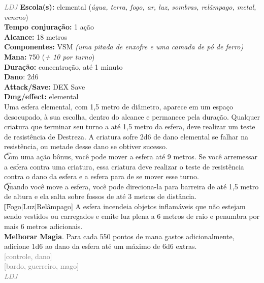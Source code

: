 \documentclass{RPG_Adventure}[2021/10/20]
\begin{document}
{\tiny \textcolor{gray}{\textit{LDJ}}}\jump{}
{\small \t \textbf{Escola(s):} elemental (\textit{água, terra, fogo, ar, luz, sombras, relâmpago, metal, veneno})\\\t \textbf{Tempo conjuração:} 1 ação\\\t \textbf{Alcance:} 18 metros\\\t \textbf{Componentes:} VSM \textit{(uma pitada de enxofre e uma camada de pó de ferro)}\\\t \textbf{Mana:} 750 (\textit{+ 10 por turno})\\\t \textbf{Duração:} concentração, até 1 minuto\\\t \textbf{Dano}: 2d6\\\t \textbf{Attack/Save:} DEX Save\\\t \textbf{Dmg/effect:} elemental\\}
{\normalsize Uma esfera elemental, com 1,5 metro de diâmetro, aparece em um espaço desocupado, à sua escolha, dentro do alcance e permanece pela duração. Qualquer criatura que terminar seu turno a até 1,5 metro da esfera, deve realizar um teste de resistência de Destreza. A criatura sofre 2d6 de dano elemental se falhar na resistência, ou metade desse dano se obtiver sucesso.\\\t Com uma ação bônus, você pode mover a esfera até 9 metros. Se você arremessar a esfera contra uma criatura, essa criatura deve realizar o teste de resistência contra o dano da esfera e a esfera para de se mover esse turno.\\\t Quando você move a esfera, você pode direciona-la para barreira de até 1,5 metro de altura e ela salta sobre fossos de até 3 metros de distância.\\\t [Fogo|Luz|Relâmpago] A esfera incendeia objetos inflamáveis que não estejam sendo vestidos ou carregados e emite luz plena a 6 metros de raio e penumbra por mais 6 metros adicionais.\\\t \textbf{Melhorar Magia}. Para cada 550 pontos de mana gastos adicionalmente, adicione 1d6 ao dano da esfera até um máximo de 6d6 extras.\\}
{\scriptsize \textcolor{gray}{[controle, dano]\\}}
{\scriptsize \textcolor{gray}{[bardo, guerreiro, mago]\\}}
{\tiny \textcolor{gray}{\textit{LDJ}}}\jump{}
\end{document}
